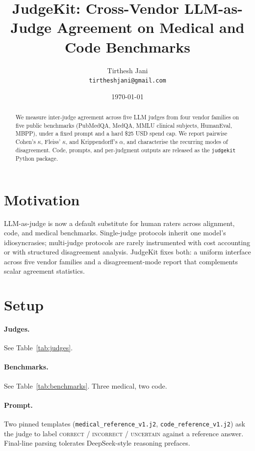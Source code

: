 \documentclass[11pt,a4paper]{article}
\title{JudgeKit: Cross-Vendor LLM-as-Judge Agreement on Medical and Code Benchmarks}
\author{Tirthesh Jani \\ \texttt{tirtheshjani@gmail.com}}
\date{\today}
\begin{document}
\maketitle

\begin{abstract}
We measure inter-judge agreement across five LLM judges from four vendor families
on five public benchmarks (PubMedQA, MedQA, MMLU clinical subjects, HumanEval, MBPP),
under a fixed prompt and a hard \$25 USD spend cap. We report pairwise Cohen's
$\kappa$, Fleiss' $\kappa$, and Krippendorff's $\alpha$, and characterise the
recurring modes of disagreement. Code, prompts, and per-judgment outputs are released as
the \texttt{judgekit} Python package.
\end{abstract}

\section{Motivation}
LLM-as-judge is now a default substitute for human raters across alignment, code, and
medical benchmarks. Single-judge protocols inherit one model's idiosyncrasies; multi-judge
protocols are rarely instrumented with cost accounting or with structured disagreement
analysis. JudgeKit fixes both: a uniform interface across five vendor families and a
disagreement-mode report that complements scalar agreement statistics.

\section{Setup}
\paragraph{Judges.} See Table~\ref{tab:judges}.
\paragraph{Benchmarks.} See Table~\ref{tab:benchmarks}. Three medical, two code.
\paragraph{Prompt.} Two pinned templates (\texttt{medical\_reference\_v1.j2},
\texttt{code\_reference\_v1.j2}) ask the judge to label
\textsc{correct} / \textsc{incorrect} / \textsc{uncertain} against a reference
answer. Final-line parsing tolerates DeepSeek-style reasoning prefaces.
\end{document}
